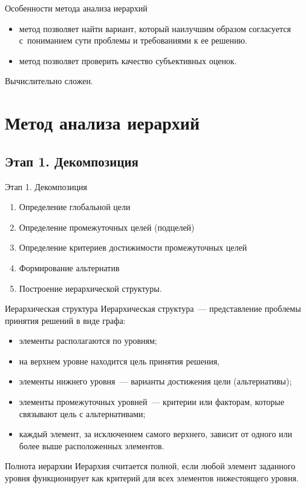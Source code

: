 \documentclass[unicode,11pt,notheorems,xcolor=table]{beamer}
\begin{document}
\begin{frame}{Особенности метода анализа иерархий}
    \begin{itemize}
        \item метод позволяет найти  вариант, который наилучшим образом согласуется с~пониманием сути проблемы и требованиями к ее решению.
        \item метод позволяет проверить качество субъективных оценок.
    \end{itemize}

    \bigskip
        Вычислительно сложен.
    
\end{frame}

\section{Метод анализа иерархий}
\subsection{Этап 1. Декомпозиция}

\begin{frame}{Этап 1. Декомпозиция}{}
    \begin{enumerate}
        \item Определение глобальной цели
        \item Определение промежуточных целей (подцелей)
        \item Определение критериев достижимости промежуточных целей 
        \item Формирование альтернатив    
        \item Построение иерархической структуры.
    \end{enumerate}
\end{frame}
\begin{frame}{Иерархическая структура}{}
    \alert{Иерархическая структура}~--- представление проблемы принятия решений в виде графа:
    \begin{itemize}
        \item элементы располагаются по уровням;
        \item на верхнем уровне находится цель принятия решения,
        \item элементы нижнего уровня~--- варианты достижения цели (альтернативы); 
        \item элементы промежуточных уровней~--- критерии или факторам, которые связывают цель с альтернативами;
        \item каждый элемент, за исключением самого верхнего, зависит от одного или более выше расположенных элементов. 
    \end{itemize}
    \begin{block}{Полнота иерархии}
        Иерархия считается \alert{полной}, если любой элемент заданного уровня функционирует как критерий для всех элементов нижестоящего уровня.
    \end{block}
\end{frame}
\end{document}
